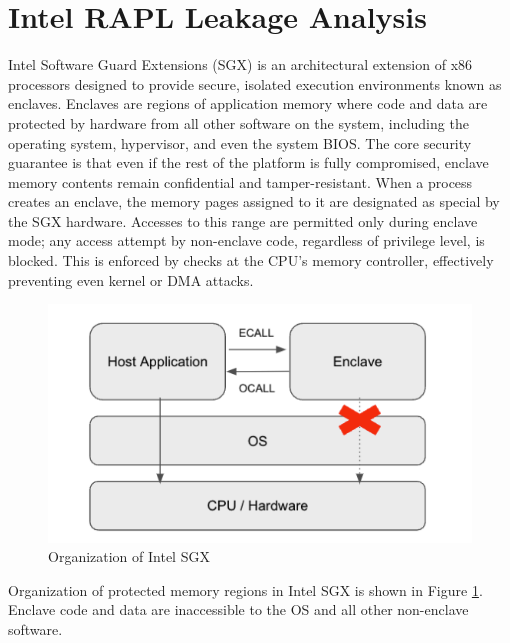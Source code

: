 \section{Intel RAPL Leakage Analysis}
Intel Software Guard Extensions (SGX) is an architectural extension of x86 processors
designed to provide secure, isolated execution environments known as enclaves. Enclaves
are regions of application memory where code and data are protected by hardware from
all other software on the system, including the operating system, hypervisor, and even the
system BIOS. The core security guarantee is that even if the rest of the platform is fully
compromised, enclave memory contents remain confidential and tamper-resistant.
When a process creates an enclave, the memory pages assigned to it are designated as
special by the SGX hardware. Accesses to this range are permitted only during enclave
mode; any access attempt by non-enclave code, regardless of privilege level, is blocked.
This is enforced by checks at the CPU’s memory controller, effectively preventing even
kernel or DMA attacks. 
\begin{figure}
    \centering
    \includegraphics[width=0.8\linewidth]{Assignment2- Writing a Research Paper in Latex/Images/Intel_SGX.png}
    \caption{Organization of Intel SGX}
    \label{fig:Intel_SGX}
\end{figure}
Organization of protected memory regions in Intel SGX is shown in Figure \ref{fig:Intel_SGX}. Enclave code and data are inaccessible to the OS and all other non-enclave software.
